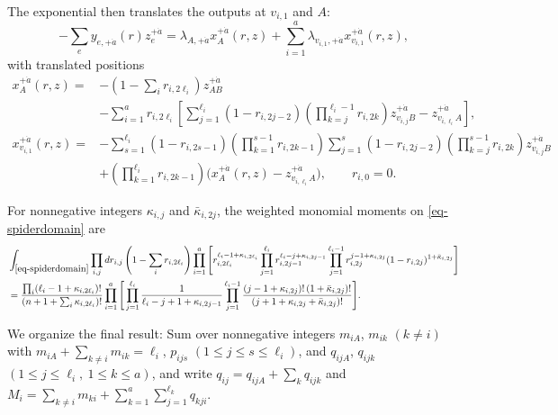 \documentclass[11pt]{article}
\numberwithin{equation}{section}
\numberwithin{figure}{section}
\numberwithin{table}{section}
\begin{document}
The exponential then translates the outputs at $v_{i,1}$ and $A$:
\begin{equation}\label{eq-spider-output-translation}
-\sum_e y_{e,+\dot a}(r)z_e^{+\dot a}
=\lambda_{A,+\dot a}x_A^{+\dot a}(r,z)
+\sum_{i=1}^a\lambda_{v_{i,1},+\dot a}x_{v_{i,1}}^{+\dot a}(r,z),
\end{equation}
with translated positions
\begin{equation}\label{eq-spider-output-points}
\begin{aligned}
x_A^{+\dot a}(r,z)
={}&-\left(1-\sum_i r_{i,2\ell_i}\right)z_{AB}^{+\dot a}\\
&-\sum_{i=1}^a r_{i,2\ell_i}\left[
\sum_{j=1}^{\ell_i}(1-r_{i,2j-2})
\left(\prod_{k=j}^{\ell_i-1}r_{i,2k}\right)z_{v_{i,j}B}^{+\dot a}
-z_{v_{i,\ell_i}A}^{+\dot a}\right],\\[3pt]
x_{v_{i,1}}^{+\dot a}(r,z)
={}&-\sum_{s=1}^{\ell_i}(1-r_{i,2s-1})
\left(\prod_{k=1}^{s-1}r_{i,2k-1}\right)
\sum_{j=1}^{s}(1-r_{i,2j-2})
\left(\prod_{k=j}^{s-1}r_{i,2k}\right)z_{v_{i,j}B}^{+\dot a}\\
&+\left(\prod_{k=1}^{\ell_i}r_{i,2k-1}\right)
\bigl(x_A^{+\dot a}(r,z)-z_{v_{i,\ell_i}A}^{+\dot a}\bigr),
\qquad r_{i,0}=0.
\end{aligned}
\end{equation}

For nonnegative integers $\kappa_{i,j}$ and $\bar\kappa_{i,2j}$, the weighted monomial moments on \eqref{eq-spiderdomain} are
\begin{equation}\label{eq-spider-moments}
\begin{aligned}
&\int_{\eqref{eq-spiderdomain}}\prod_{i,j}dr_{i,j}
\left(1-\sum_i r_{i,2\ell_i}\right)
\prod_{i=1}^a\Bigg[r_{i,2\ell_i}^{\ell_i-1+\kappa_{i,2\ell_i}}
\prod_{j=1}^{\ell_i}r_{i,2j-1}^{\ell_i-j+\kappa_{i,2j-1}}
\prod_{j=1}^{\ell_i-1}r_{i,2j}^{j-1+\kappa_{i,2j}}(1-r_{i,2j})^{1+\bar\kappa_{i,2j}}\Bigg]\\
&=\frac{\prod_i(\ell_i-1+\kappa_{i,2\ell_i})!}{(n+1+\sum_i \kappa_{i,2\ell_i})!}
\prod_{i=1}^a\Bigg[\prod_{j=1}^{\ell_i}\frac1{\ell_i-j+1+\kappa_{i,2j-1}}
\prod_{j=1}^{\ell_i-1}
\frac{(j-1+\kappa_{i,2j})!\,(1+\bar\kappa_{i,2j})!}{(j+1+\kappa_{i,2j}+\bar\kappa_{i,2j})!}\Bigg].
\end{aligned}
\end{equation}

We organize the final result: Sum over nonnegative integers $m_{iA}$, $m_{ik}$ $(k\ne i)$ with $m_{iA}+\sum_{k\ne i}m_{ik}=\ell_i$, $p_{ijs}$ $(1\le j\le s\le\ell_i)$, and $q_{ijA}$, $q_{ijk}$ $(1\le j\le\ell_i,\ 1\le k\le a)$, and write $q_{ij}=q_{ijA}+\sum_kq_{ijk}$ and $M_i=\sum_{k\ne i}m_{ki}+\sum_{k=1}^a\sum_{j=1}^{\ell_k}q_{kji}$.
\end{document}
